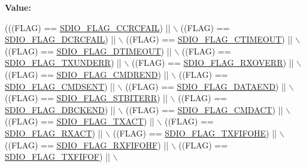 {\bfseries Value\+:}
\begin{DoxyCode}
(((FLAG)  == \hyperlink{group___s_d_i_o___flags_ga8ff1f3960378e05ec3c949940e1c49d0}{SDIO\_FLAG\_CCRCFAIL}) || \(\backslash\)
                            ((FLAG)  == \hyperlink{group___s_d_i_o___flags_ga6de936ea11cbc79444d519268ad9f9bd}{SDIO\_FLAG\_DCRCFAIL}) || \(\backslash\)
                            ((FLAG)  == \hyperlink{group___s_d_i_o___flags_ga7389f64ff6cfa4f459bf852b5faede30}{SDIO\_FLAG\_CTIMEOUT}) || \(\backslash\)
                            ((FLAG)  == \hyperlink{group___s_d_i_o___flags_ga2d2fd219dd9fea522862195ab9568345}{SDIO\_FLAG\_DTIMEOUT}) || \(\backslash\)
                            ((FLAG)  == \hyperlink{group___s_d_i_o___flags_gabd18f8e5d5387a38dccbe1bf28ae5dbc}{SDIO\_FLAG\_TXUNDERR}) || \(\backslash\)
                            ((FLAG)  == \hyperlink{group___s_d_i_o___flags_gad49d60039e40d31b734cfacf90caa84f}{SDIO\_FLAG\_RXOVERR}) || \(\backslash\)
                            ((FLAG)  == \hyperlink{group___s_d_i_o___flags_ga083531db75a1e4c05c47578763d53af1}{SDIO\_FLAG\_CMDREND}) || \(\backslash\)
                            ((FLAG)  == \hyperlink{group___s_d_i_o___flags_gac81f3837aac17a6aed7310a8ea460f17}{SDIO\_FLAG\_CMDSENT}) || \(\backslash\)
                            ((FLAG)  == \hyperlink{group___s_d_i_o___flags_gaaacb2f6207c149e05f8bdd70e5d49926}{SDIO\_FLAG\_DATAEND}) || \(\backslash\)
                            ((FLAG)  == \hyperlink{group___s_d_i_o___flags_gae83f7cb3fa1183898131f3de47c2333e}{SDIO\_FLAG\_STBITERR}) || \(\backslash\)
                            ((FLAG)  == \hyperlink{group___s_d_i_o___flags_ga5452d8033567821709bd7d5f06547b70}{SDIO\_FLAG\_DBCKEND}) || \(\backslash\)
                            ((FLAG)  == \hyperlink{group___s_d_i_o___flags_gad12a9b2bd30e7b907cbabfd92fc645b3}{SDIO\_FLAG\_CMDACT}) || \(\backslash\)
                            ((FLAG)  == \hyperlink{group___s_d_i_o___flags_gad5d075c98012586b169ec131aab2eeb5}{SDIO\_FLAG\_TXACT}) || \(\backslash\)
                            ((FLAG)  == \hyperlink{group___s_d_i_o___flags_gacc935dd830338970890a05922dff8ab7}{SDIO\_FLAG\_RXACT}) || \(\backslash\)
                            ((FLAG)  == \hyperlink{group___s_d_i_o___flags_gae9277461d3c8984dc31af318e2df1959}{SDIO\_FLAG\_TXFIFOHE}) || \(\backslash\)
                            ((FLAG)  == \hyperlink{group___s_d_i_o___flags_ga8c5942ae3df21efad2d7c61a46015758}{SDIO\_FLAG\_RXFIFOHF}) || \(\backslash\)
                            ((FLAG)  == \hyperlink{group___s_d_i_o___flags_gad3ca936300ef251639a4cfbe2f63b6b8}{SDIO\_FLAG\_TXFIFOF}) || \(\backslash\)

\end{DoxyCode}
